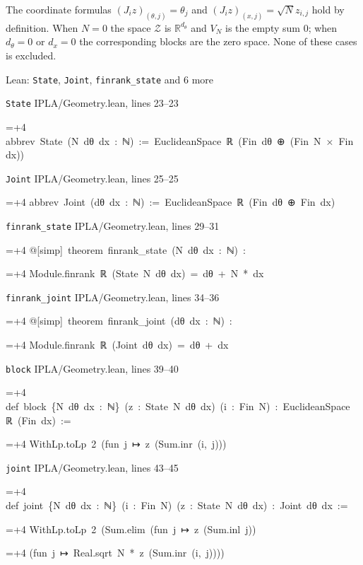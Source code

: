 \documentclass[11pt,a4paper]{article}
\newlength{\leancharwidth}
\newenvironment{leancode}{\par\smallskip\begingroup\ttfamily\footnotesize\raggedright
  \settowidth{\leancharwidth}{M}\setlength{\parskip}{0pt}\setlength{\parindent}{0pt}
  \frenchspacing}{\par\endgroup\smallskip}
\newcommand{\leanline}[2]{\hangindent=\dimexpr#1\leancharwidth+4\leancharwidth\relax
  \hangafter=1\noindent\hspace*{#1\leancharwidth}#2\par}
\newcommand{\leansource}[1]{\par{\footnotesize\color{leanmuted}#1}\par}
\begin{document}
The coordinate formulas \((J_iz)_{(\theta,j)}=\theta_j\) and \((J_iz)_{(x,j)}=\sqrt N z_{i,j}\) hold by definition. When \(N=0\) the space \(\mathcal Z\) is \(\mathbb R^{d_\theta}\) and \(V_N\) is the empty sum \(0\); when \(d_\theta=0\) or \(d_x=0\) the corresponding blocks are the zero space. None of these cases is excluded.

\begin{leanbox}{Lean: \texttt{State}, \texttt{Joint}, \texttt{finrank\_\allowbreak{}state} and 6 more}
\leansource{\texttt{State} \quad IPLA/\allowbreak{}Geometry.lean, lines 23–23}
\begin{leancode}
\leanline{0}{abbrev\ State\ (N\ dθ\ dx\ :\ ℕ)\ :=\ EuclideanSpace\ ℝ\ (Fin\ dθ\ ⊕\ (Fin\ N\ ×\ Fin\ dx))}
\end{leancode}
\leansource{\texttt{Joint} \quad IPLA/\allowbreak{}Geometry.lean, lines 25–25}
\begin{leancode}
\leanline{0}{abbrev\ Joint\ (dθ\ dx\ :\ ℕ)\ :=\ EuclideanSpace\ ℝ\ (Fin\ dθ\ ⊕\ Fin\ dx)}
\end{leancode}
\leansource{\texttt{finrank\_\allowbreak{}state} \quad IPLA/\allowbreak{}Geometry.lean, lines 29–31}
\begin{leancode}
\leanline{0}{@[simp]\ theorem\ finrank\_state\ (N\ dθ\ dx\ :\ ℕ)\ :}
\leanline{4}{Module.finrank\ ℝ\ (State\ N\ dθ\ dx)\ =\ dθ\ +\ N\ *\ dx}
\end{leancode}
\leansource{\texttt{finrank\_\allowbreak{}joint} \quad IPLA/\allowbreak{}Geometry.lean, lines 34–36}
\begin{leancode}
\leanline{0}{@[simp]\ theorem\ finrank\_joint\ (dθ\ dx\ :\ ℕ)\ :}
\leanline{4}{Module.finrank\ ℝ\ (Joint\ dθ\ dx)\ =\ dθ\ +\ dx}
\end{leancode}
\leansource{\texttt{block} \quad IPLA/\allowbreak{}Geometry.lean, lines 39–40}
\begin{leancode}
\leanline{0}{def\ block\ \{N\ dθ\ dx\ :\ ℕ\}\ (z\ :\ State\ N\ dθ\ dx)\ (i\ :\ Fin\ N)\ :\ EuclideanSpace\ ℝ\ (Fin\ dx)\ :=}
\leanline{2}{WithLp.toLp\ 2\ (fun\ j\ ↦\ z\ (Sum.inr\ (i,\ j)))}
\end{leancode}
\leansource{\texttt{joint} \quad IPLA/\allowbreak{}Geometry.lean, lines 43–45}
\begin{leancode}
\leanline{0}{def\ joint\ \{N\ dθ\ dx\ :\ ℕ\}\ (i\ :\ Fin\ N)\ (z\ :\ State\ N\ dθ\ dx)\ :\ Joint\ dθ\ dx\ :=}
\leanline{2}{WithLp.toLp\ 2\ (Sum.elim\ (fun\ j\ ↦\ z\ (Sum.inl\ j))}
\leanline{4}{(fun\ j\ ↦\ Real.sqrt\ N\ *\ z\ (Sum.inr\ (i,\ j))))}
\end{leancode}

\end{leanbox}
\end{document}
